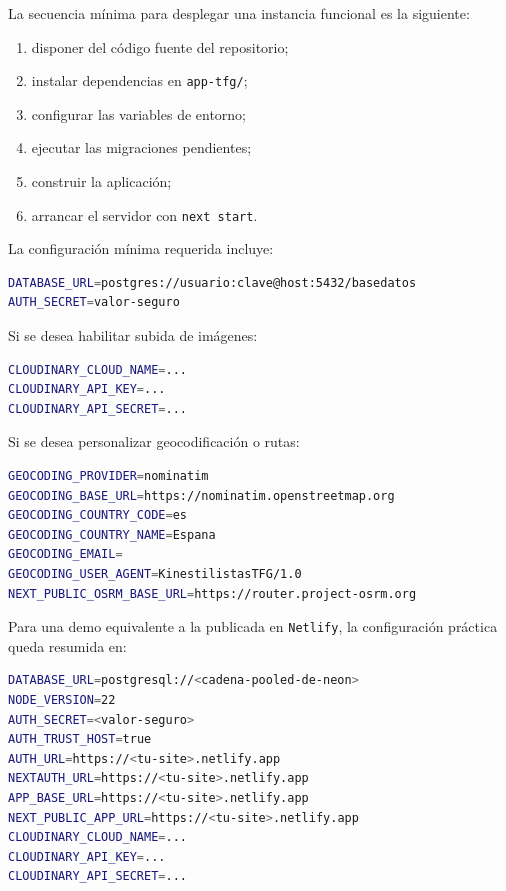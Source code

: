 La secuencia mínima para desplegar una instancia funcional es la siguiente:

\begin{enumerate}
    \item disponer del código fuente del repositorio;
    \item instalar dependencias en \texttt{app-tfg/};
    \item configurar las variables de entorno;
    \item ejecutar las migraciones pendientes;
    \item construir la aplicación;
    \item arrancar el servidor con \texttt{next start}.
\end{enumerate}

La configuración mínima requerida incluye:

\begin{lstlisting}[language=bash]
DATABASE_URL=postgres://usuario:clave@host:5432/basedatos
AUTH_SECRET=valor-seguro
\end{lstlisting}

Si se desea habilitar subida de imágenes:

\begin{lstlisting}[language=bash]
CLOUDINARY_CLOUD_NAME=...
CLOUDINARY_API_KEY=...
CLOUDINARY_API_SECRET=...
\end{lstlisting}

Si se desea personalizar geocodificación o rutas:

\begin{lstlisting}[language=bash]
GEOCODING_PROVIDER=nominatim
GEOCODING_BASE_URL=https://nominatim.openstreetmap.org
GEOCODING_COUNTRY_CODE=es
GEOCODING_COUNTRY_NAME=Espana
GEOCODING_EMAIL=
GEOCODING_USER_AGENT=KinestilistasTFG/1.0
NEXT_PUBLIC_OSRM_BASE_URL=https://router.project-osrm.org
\end{lstlisting}

Para una demo equivalente a la publicada en \texttt{Netlify}, la configuración práctica queda resumida en:

\begin{lstlisting}[language=bash]
DATABASE_URL=postgresql://<cadena-pooled-de-neon>
NODE_VERSION=22
AUTH_SECRET=<valor-seguro>
AUTH_TRUST_HOST=true
AUTH_URL=https://<tu-site>.netlify.app
NEXTAUTH_URL=https://<tu-site>.netlify.app
APP_BASE_URL=https://<tu-site>.netlify.app
NEXT_PUBLIC_APP_URL=https://<tu-site>.netlify.app
CLOUDINARY_CLOUD_NAME=...
CLOUDINARY_API_KEY=...
CLOUDINARY_API_SECRET=...
\end{lstlisting}

